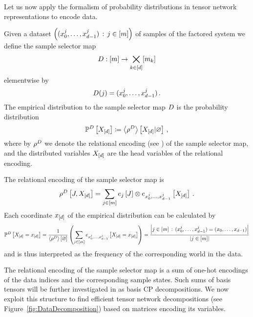 \label{sec:empDistribution}

Let us now apply the formalism of probability distributions in tensor network representations to encode data.
\begin{definition}\label{def:dataMap}
Given a dataset $\left(({x_{0}^{j},\ldots,x_{d-1}^{j}})\,:\,j\in[m]\right)$ of samples of the factored system we define the sample selector map
\[ D : [m] \rightarrow \bigtimes_{k\in[d]}[m_{k}] \]
elementwise by
\[ D(j) = ({x_{0}^{j},\ldots,x_{d-1}^{j}}) \, . \]
The empirical distribution to the sample selector map $D$ is the probability distribution
\begin{align*}
\mathbb{P}^{D}\left[X_{[d]}\right]
\coloneqq \left\langle \rho^{D}\right\rangle \left[ X_{[d]} | \varnothing \right] \, ,
\end{align*}
where by $\rho^{D}$ we denote the relational encoding (see ) of the sample selector map, and the distributed variables $X_{[d]}$ are the head variables of the relational encoding.
\end{definition}

The relational encoding of the sample selector map is
\begin{align*}
\rho^{D}\left[J,X_{[d]}\right]
= \sum_{j\in[m]} e_{j}\left[J\right] \otimes e_{{x_{0}^{j},\ldots,x_{d-1}^{j}}}\left[X_{[d]}\right] \, .
\end{align*}
Each coordinate $x_{[d]}$ of the empirical distribution can be calculated by
\begin{align*}
\mathbb{P}^{D}\left[X_{[d]}=x_{[d]}\right]
= \frac{1}{\left\langle \rho^{D}\right\rangle \left[ \varnothing \right]} \left( \sum_{j\in[m]} e_{{x_{0}^{j},\ldots,x_{d-1}^{j}}}\left[X_{[d]}=x_{[d]}\right]  \right)
= \frac{\left|j\in[m] \, : \, ({x_{0}^{j},\ldots,x_{d-1}^{j}}) = (x_{0},\ldots,x_{d-1})\right|}{\left|j\in[m]\right|}
\end{align*}
and is thus interpreted as the frequency of the corresponding world in the data.

The relational encoding of the sample selector map is a sum of one-hot encodings of the data indices and the corresponding sample states.
Such sums of basis tensors will be further investigated in  as basis CP decompositions.
We now exploit this structure to find efficient tensor network decompositions (see Figure~\ref{fig:DataDecomposition}) based on matrices encoding its variables.


